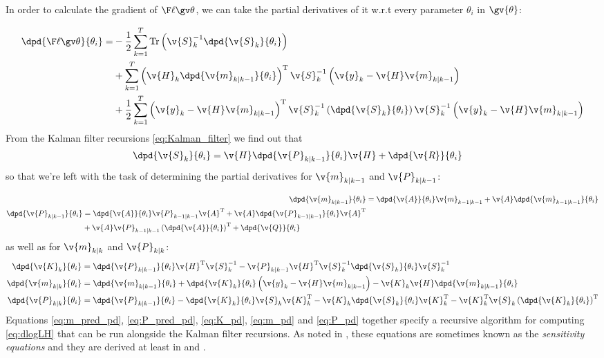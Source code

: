 In order to calculate the gradient of $\lLH$, we can take the partial
derivatives of it w.r.t every parameter $\theta_i$ in $\gv{\theta}$:

\begin{align}
\begin{split}
	\dpd{\lLH}{\theta_i}
	=&-\frac{1}{2}\sum_{k=1}^T\mathrm{Tr}\left(\v{S}_{k}^{-1}\dpd{\v{S}_k}{\theta_i}\right)\\
	&+\sum_{k=1}^T\left(\v{H}_k\dpd{\v{m}_{k|k-1}}{\theta_i}\right)^\tr\v{S}_{k}^{-1}\left(\v{y}_k-\v{H}\v{m}_{k|k-1}\right)\\
	&+\frac{1}{2}\sum_{k=1}^T\left(\v{y}_k-\v{H}\v{m}_{k|k-1}\right)^\tr\v{S}_{k}^{-1}\left(\dpd{\v{S}_k}{\theta_i}\right)\v{S}_{k}^{-1}\left(\v{y}_k-\v{H}\v{m}_{k|k-1}\right)\\
	\label{eq:dlogLH}
\end{split}
\end{align}
From the Kalman filter recursions \eqref{eq:Kalman_filter} we find out that 
\begin{align}
	\dpd{\v{S}_k}{\theta_i}&=\v{H}\dpd{\v{P}_{k|k-1}}{\theta_i}\v{H}+\dpd{\v{R}}{\theta_i}
\end{align}
so that we're left with the task of determining the partial derivatives for
$\v{m}_{k|k-1}$ and $\v{P}_{k|k-1}$:

\begin{align}
	\dpd{\v{m}_{k|k-1}}{\theta_i}&=\dpd{\v{A}}{\theta_i}\v{m}_{k-1|k-1}+\v{A}\dpd{\v{m}_{k-1|k-1}}{\theta_i} \label{eq:m_pred_pd}\\
	\begin{split}
	\dpd{\v{P}_{k|k-1}}{\theta_i}&=\dpd{\v{A}}{\theta_i}\v{P}_{k-1|k-1}\v{A}^\tr+\v{A}\dpd{\v{P}_{k-1|k-1}}{\theta_i}\v{A}^\tr\\
	&+\v{A}\v{P}_{k-1|k-1}\left(\dpd{\v{A}}{\theta_i}\right)^\tr+\dpd{\v{Q}}{\theta_i} \label{eq:P_pred_pd}
	\end{split}
\end{align}
as well as for $\v{m}_{k|k}$ and $\v{P}_{k|k}$:
\begin{align}
	\dpd{\v{K}_k}{\theta_i}&=\dpd{\v{P}_{k|k-1}}{\theta_i}\v{H}^\tr\v{S}_{k}^{-1}-\v{P}_{k|k-1}\v{H}^\tr\v{S}_{k}^{-1}\dpd{\v{S}_k}{\theta_i}\v{S}_{k}^{-1}
	\label{eq:K_pd}\\
	\dpd{\v{m}_{k|k}}{\theta_i}&=\dpd{\v{m}_{k|k-1}}{\theta_i}+\dpd{\v{K}_k}{\theta_i}\left(\v{y}_k-\v{H}\v{m}_{k|k-1}\right)-\v{K}_k\v{H}\dpd{\v{m}_{k|k-1}}{\theta_i}
	\label{eq:m_pd}\\
	\dpd{\v{P}_{k|k}}{\theta_i}&=\dpd{\v{P}_{k|k-1}}{\theta_i}-\dpd{\v{K}_k}{\theta_i}\v{S}_{k}\v{K}_{k}^\tr-\v{K}_{k}\dpd{\v{S}_k}{\theta_i}\v{K}_{k}^\tr-\v{K}_{k}^\tr\v{S}_{k}\left(\dpd{\v{K}_k}{\theta_i}\right)^\tr
	\label{eq:P_pd}
	\end{align}
Equations \eqref{eq:m_pred_pd}, \eqref{eq:P_pred_pd}, \eqref{eq:K_pd}, \eqref{eq:m_pd} and \eqref{eq:P_pd} together specify
a recursive algorithm for computing \eqref{eq:dlogLH} that can be run alongside the Kalman filter recursions.
As noted in \textcite{Cappe2005}, these equations are sometimes known as the \emph{sensitivity equations}
and they are derived at least in \textcite{Gupta1974} and \textcite{Mbalawataa}.

